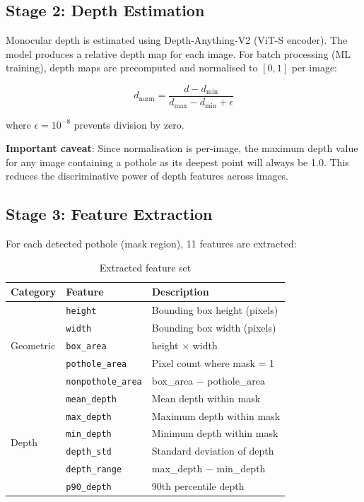 \documentclass[12pt, a4paper]{article}
\begin{document}
\subsection{Stage 2: Depth Estimation}
\label{subsec:depth}

Monocular depth is estimated using Depth-Anything-V2 (ViT-S encoder). The model produces a relative depth map for each image. For batch processing (ML training), depth maps are precomputed and normalised to $[0, 1]$ per image:

\begin{equation}
    d_{\text{norm}} = \frac{d - d_{\min}}{d_{\max} - d_{\min} + \epsilon}
\end{equation}

where $\epsilon = 10^{-8}$ prevents division by zero.

\textbf{Important caveat}: Since normalisation is per-image, the maximum depth value for any image containing a pothole as its deepest point will always be 1.0. This reduces the discriminative power of depth features across images.

\subsection{Stage 3: Feature Extraction}
\label{subsec:features}

For each detected pothole (mask region), 11 features are extracted:

\begin{table}[H]
\centering
\caption{Extracted feature set}
\begin{tabular}{lll}
\toprule
\textbf{Category} & \textbf{Feature} & \textbf{Description} \\
\midrule
\multirow{5}{*}{Geometric}
& \texttt{height} & Bounding box height (pixels) \\
& \texttt{width} & Bounding box width (pixels) \\
& \texttt{box\_area} & height $\times$ width \\
& \texttt{pothole\_area} & Pixel count where mask = 1 \\
& \texttt{nonpothole\_area} & box\_area $-$ pothole\_area \\
\midrule
\multirow{6}{*}{Depth}
& \texttt{mean\_depth} & Mean depth within mask \\
& \texttt{max\_depth} & Maximum depth within mask \\
& \texttt{min\_depth} & Minimum depth within mask \\
& \texttt{depth\_std} & Standard deviation of depth \\
& \texttt{depth\_range} & max\_depth $-$ min\_depth \\
& \texttt{p90\_depth} & 90th percentile depth \\
\bottomrule
\end{tabular}
\end{table}
\end{document}
